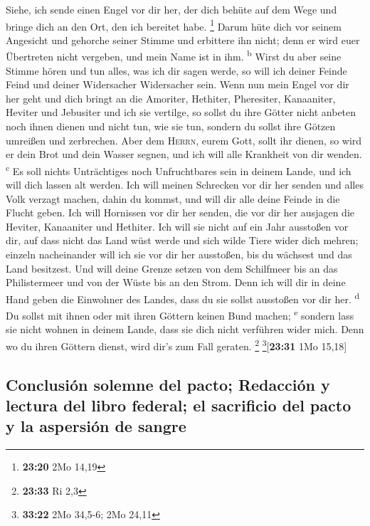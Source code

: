  Siehe, ich sende einen Engel vor dir her, der dich
behüte auf dem Wege und bringe dich an den Ort, den ich bereitet habe.
\footnote{\textbf{23:20} 2Mo 14,19}  Darum hüte dich vor
seinem Angesicht und gehorche seiner Stimme und erbittere ihn nicht;
denn er wird euer Übertreten nicht vergeben, und mein Name ist in ihm.
\textsuperscript{b}  Wirst du aber seine Stimme hören und
tun alles, was ich dir sagen werde, so will ich deiner Feinde Feind und
deiner Widersacher Widersacher sein.  Wenn nun mein Engel
vor dir her geht und dich bringt an die Amoriter, Hethiter, Pheresiter,
Kanaaniter, Heviter und Jebusiter und ich sie vertilge, 
so sollst du ihre Götter nicht anbeten noch ihnen dienen und nicht tun,
wie sie tun, sondern du sollst ihre Götzen umreißen und zerbrechen.
 Aber dem \textsc{Herrn}, eurem Gott, sollt ihr dienen,
so wird er dein Brot und dein Wasser segnen, und ich will alle Krankheit
von dir wenden. \textsuperscript{c}  Es soll nichts
Unträchtiges noch Unfruchtbares sein in deinem Lande, und ich will dich
lassen alt werden.  Ich will meinen Schrecken vor dir her
senden und alles Volk verzagt machen, dahin du kommst, und will dir alle
deine Feinde in die Flucht geben.  Ich will Hornissen vor
dir her senden, die vor dir her ausjagen die Heviter, Kanaaniter und
Hethiter.  Ich will sie nicht auf ein Jahr ausstoßen vor
dir, auf dass nicht das Land wüst werde und sich wilde Tiere wider dich
mehren;  einzeln nacheinander will ich sie vor dir her
ausstoßen, bis du wächsest und das Land besitzest.  Und
will deine Grenze setzen von dem Schilfmeer bis an das Philistermeer und
von der Wüste bis an den Strom. Denn ich will dir in deine Hand geben
die Einwohner des Landes, dass du sie sollst ausstoßen vor dir her.
\textsuperscript{d}  Du sollst mit ihnen oder mit ihren
Göttern keinen Bund machen; \textsuperscript{e}  sondern
lass sie nicht wohnen in deinem Lande, dass sie dich nicht verführen
wider mich. Denn wo du ihren Göttern dienst, wird dir's zum Fall
geraten. \footnote{\textbf{23:33} Ri 2,3} \footnote{\textbf{33:22} 2Mo
  34,5-6; 2Mo 24,11}{[}\textbf{23:31} 1Mo 15,18{]}

\hypertarget{conclusiuxf3n-solemne-del-pacto-redacciuxf3n-y-lectura-del-libro-federal-el-sacrificio-del-pacto-y-la-aspersiuxf3n-de-sangre}{%
\subsection{Conclusión solemne del pacto; Redacción y lectura del libro
federal; el sacrificio del pacto y la aspersión de
sangre}\label{conclusiuxf3n-solemne-del-pacto-redacciuxf3n-y-lectura-del-libro-federal-el-sacrificio-del-pacto-y-la-aspersiuxf3n-de-sangre}}

